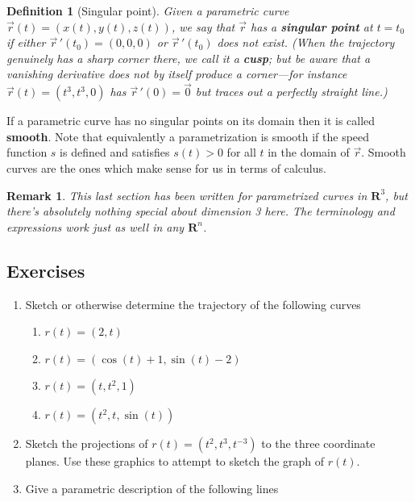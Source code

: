 \documentclass[12pt]{article}
\numberwithin{equation}{subsection}
\numberwithin{figure}{subsection}
\newtheorem{defn}[subsection]{Definition}
\theoremstyle{note}
\newtheorem{remark}[subsection]{Remark}
\begin{document}
{\begin{defn}[Singular point] Given a parametric curve $\vec{r}(t)=(x(t),y(t),z(t))$, we say that $\vec{r}$ has a \textbf{singular point} at $t=t_0$ if either $\vec{r}\,'(t_0)=(0,0,0)$ or $\vec{r}\,'(t_0)$ does not exist. (When the trajectory genuinely has a sharp corner there, we call it a \textbf{cusp}; but be aware that a vanishing derivative does not by itself produce a corner---for instance $\vec r(t)=(t^3,t^3,0)$ has $\vec r\,'(0)=\vec 0$ but traces out a perfectly straight line.) \end{defn}

If a parametric curve has no singular points on its domain then it is called \textbf{smooth}. Note that equivalently a parametrization is smooth if the speed function $s$ is defined and satisfies $s(t)>0$ for all $t$ in the domain of $\vec{r}$. Smooth curves are the ones which make sense for us in terms of calculus.

\begin{remark}
This last section has been written for parametrized curves in $\mathbf{R}^3$, but there's absolutely nothing special about dimension 3 here. The terminology and expressions work just as well in any $\mathbf{R}^n$.
\end{remark}

\subsection{Exercises} 
\begin{enumerate}[label=\arabic*.]
\item Sketch or otherwise determine the trajectory of the following curves

\begin{enumerate}
	\item $r(t)=(2, t)$
	\item $r(t)=(\cos(t)+1, \sin(t)-2)$
	\item $r(t)=(t,t^2,1)$
	\item $r(t)=(t^2, t, \sin(t))$

\end{enumerate}

\item Sketch the projections of $r(t)=(t^2,t^3, t^{-3})$ to the three coordinate planes. Use these graphics to attempt to sketch the graph of $r(t)$.



\item Give a parametric description of the following lines


\end{enumerate}}
\end{document}
